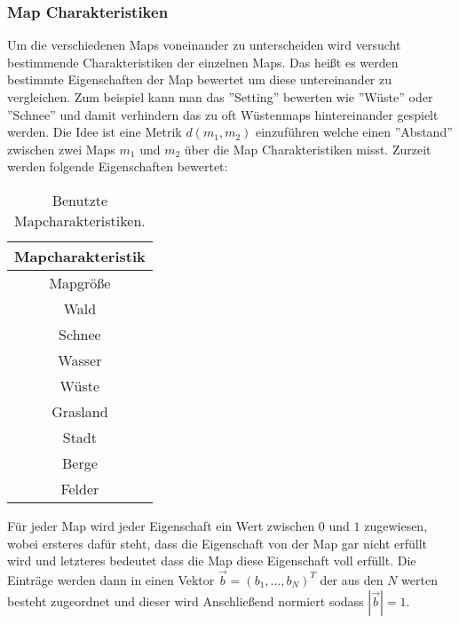         \subsubsection{Map Charakteristiken}
            Um die verschiedenen Maps voneinander zu unterscheiden wird versucht bestimmende Charakteristiken der einzelnen Maps.
            Das heißt es werden bestimmte Eigenschaften der Map bewertet um diese untereinander zu vergleichen.
            Zum beispiel kann man das ''Setting'' bewerten wie ''Wüste'' oder ''Schnee'' und damit verhindern das zu oft Wüstenmaps hintereinander gespielt werden.
            Die Idee ist eine Metrik $d(m_1,m_2)$ einzuführen welche einen ''Abstand'' zwischen zwei Maps $m_1$ und $m_2$ über die Map Charakteristiken misst.
            Zurzeit werden folgende Eigenschaften bewertet:
            \begin{table}[h]
                \centering
                \begin{tabular}{|| c ||}
                    \hline
                    \textbf{Mapcharakteristik}  \\
                    \hline
                    \hline
                    Mapgröße \\
                    \hline
                    Wald \\
                    \hline
                    Schnee \\
                    \hline
                    Wasser \\
                    \hline
                    Wüste \\
                    \hline
                    Grasland \\
                    \hline
                    Stadt \\
                    \hline
                    Berge \\
                    \hline
                    Felder \\
                    \hline
                \end{tabular}
                \caption{Benutzte Mapcharakteristiken.}
                \label{t:Aufbau:Charakteristiken}
            \end{table}
            Für jeder Map wird jeder Eigenschaft ein Wert zwischen $0$ und $1$ zugewiesen, wobei ersteres dafür steht, dass die Eigenschaft von der Map gar nicht erfüllt wird und letzteres bedeutet dass die Map diese Eigenschaft voll erfüllt. 
            Die Einträge werden dann in einen Vektor $\vec{b}=(b_1,...,b_N)^T$ der aus den $N$ werten besteht zugeordnet und dieser wird Anschließend normiert sodass $|\vec{b}|=1$.

